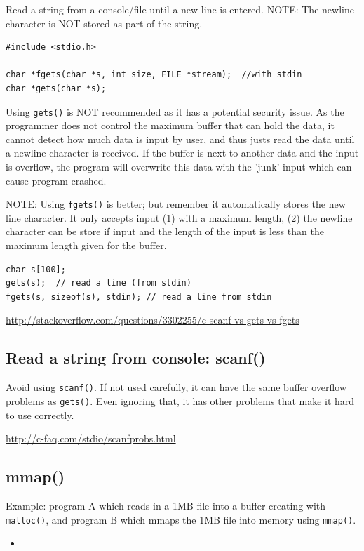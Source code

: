 Read a string from a console/file until a new-line is entered.
NOTE: The newline character is NOT stored as part of the string.

\begin{verbatim}
#include <stdio.h>

char *fgets(char *s, int size, FILE *stream);  //with stdin 
char *gets(char *s);
\end{verbatim}

Using \verb!gets()! is NOT recommended as it has a potential security issue. As
the programmer does not control the maximum buffer that can hold the data, it
cannot detect how much data is input by user, and thus justs read the data until
a newline character is received. If the buffer is next to another data and the
input is overflow, the program will overwrite this data with the 'junk' input
which can cause program crashed.

NOTE: Using \verb!fgets()! is better; but remember it automatically stores the
new line character. It only accepts input (1) with a maximum length, (2) the
newline character can be store if input and the length of the input is less than
the maximum length given for the buffer.

\begin{verbatim}
char s[100];
gets(s);  // read a line (from stdin)
fgets(s, sizeof(s), stdin); // read a line from stdin
\end{verbatim}

\url{http://stackoverflow.com/questions/3302255/c-scanf-vs-gets-vs-fgets}

\subsection{Read a string from console: scanf()}

Avoid using \verb!scanf()!. If not used carefully, it can have the same buffer
overflow problems as \verb!gets()!. Even ignoring that, it has other problems
that make it hard to use correctly.

\url{http://c-faq.com/stdio/scanfprobs.html}




\subsection{mmap()}
\label{sec:mmap()}	


Example:
program A which reads in a 1MB file into a buffer creating with \verb!malloc()!,
and program B which mmaps the 1MB file into memory using \verb!mmap()!.
\begin{itemize}
  \item 
\end{itemize}


